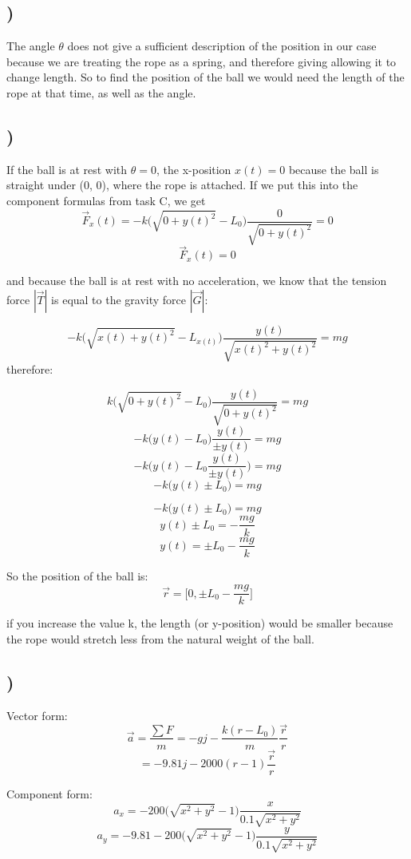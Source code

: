 \documentclass[a4paper,10pt,norsk]{article}
\begin{document}
\subsection{)}
The angle $\theta$ does not give a sufficient description of the position in our case because we are treating the rope as a spring, and therefore giving allowing it to change length. So to find the position of the ball we would need the length of the rope at that time, as well as the angle.

\subsection{)}
If the ball is at rest with $\theta = 0$, the x-position $x(t) = 0$ because the ball is straight under (0, 0), where the rope is attached. If we put this into the component formulas from task C, we get
\[\vec{F}_{x}(t) = -k\Big(\sqrt{0 + y(t)^{2}} - L_{0} \Big)\frac{0}{\sqrt{0 + y(t)^{2}}} = 0\]
\[\vec{F}_{x}(t) = 0\]

and because the ball is at rest with no acceleration, we know that the tension force $|\vec{T}|$ is equal to the gravity force $|\vec{G}|$: 

\[- k\Big(\sqrt{x(t) + y(t)^{2}} - L_{x(t)} \Big)\frac{y(t)}{\sqrt{x(t)^{2}+ y(t)^{2}}} = mg\]
therefore:

\[k\Big(\sqrt{0 + y(t)^{2}} - L_{0} \Big)\frac{y(t)}{\sqrt{0 + y(t)^{2}}} = mg\]
\[- k\Big(y(t) - L_{0} \Big)\frac{y(t)}{\pm y(t)} = mg\]
\[- k\Big(y(t) - L_{0}\frac{y(t)}{\pm y(t)}\Big) = mg\]
\[- k\Big(y(t) \pm L_{0}\Big) = mg\]

\[- k\Big(y(t) \pm L_{0} \Big) = mg\]
\[y(t) \pm L_{0} = -\frac{mg}{k}\]
\[y(t) = \pm L_{0} -\frac{mg}{k}\]

So the position of the ball is:
\[\vec{r} = \Big[0, \pm L_{0} - \frac{mg}{k}\Big]\]

if you increase the value k, the length (or y-position) would be smaller because the rope would stretch less from the natural weight of the ball.

\subsection{)}

Vector form:
\[\vec{a} = \frac{\sum{F}}{m} = -gj - \frac{k(r-L_{0})}{m}\frac{\vec{r}}{r}\]
\[ = -9.81j - 2000(r-1)\frac{\vec{r}}{r}\]

Component form:
\[a_{x} = -200\Big(\sqrt{x^{2} + y^{2}} - 1 \Big) \frac{x}{0.1\sqrt{x^{2} + y^{2}}}\]
\[a_{y} = -9.81 - 200\Big(\sqrt{x^{2} + y^{2}} - 1 \Big) \frac{y}{0.1\sqrt{x^{2} + y^{2}}}\]
\end{document}
